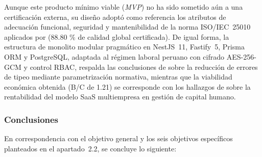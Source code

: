 Aunque este producto mínimo viable (\textit{MVP}) no ha sido sometido aún a una certificación externa, 
su diseño adoptó como referencia los atributos de adecuación funcional, 
seguridad y mantenibilidad de la norma ISO/IEC~25010 aplicados por \textcite{zeballos2022sistema} 
(88.80 \% de calidad global certificada). De igual forma, la estructura de monolito modular pragmático en NestJS~11, 
Fastify~5, Prisma ORM y PostgreSQL, adaptada al régimen laboral peruano con cifrado AES-256-GCM y 
control RBAC, respalda las conclusiones de \textcite{masapanta2025desarrollo} sobre la reducción de errores de tipeo mediante parametrización normativa, 
mientras que la viabilidad económica obtenida (B/C de 1.21) se corresponde con los hallazgos de \textcite{basualdo2026sistema} 
sobre la rentabilidad del modelo SaaS multiempresa en gestión de capital humano.

\subsubsection{Conclusiones}
En correspondencia con el objetivo general y los seis objetivos específicos planteados en el apartado~2.2, se concluye lo siguiente:


